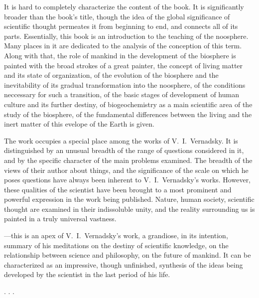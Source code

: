 It is hard to completely characterize the content of the book.  It is
significantly broader than the book's title, though the idea of the global
significance of scientific thought permeates it from beginning to end, and
connects all of its parts.  Essentially, this book is an introduction to the
teaching of the noosphere.  Many places in it are dedicated to the analysis of
the conception of this term.  Along with that, the role of mankind in the
development of the biosphere is painted with the broad strokes of a great
painter, the concept of living matter and its state of organization, of the
evolution of the biosphere and the inevitability of its gradual transformation
into the noosphere, of the conditions neccessary for such a transition, of the
basic stages of development of human culture and its further destiny, of
biogeochemistry as a main scientific area of the study of the biosphere, of the
fundamental differences between the living and the inert matter of this evelope
of the Earth is given.

The work  occupies a
special place among the works of V.~I.\ Vernadsky.  It is distinguished by an
unusual breadth of the range of questions considered in it, and by the specific
character of the main problems examined.  The breadth of the views of their
author about things, and the significance of the scale on which he poses
questions have always been inherent to V.~I.\ Vernadsky's works.  However,
these qualities of the scientist have been brought to a most prominent and
powerful expression in the work being published.  Nature, human society,
scientific thought are examined in their indissoluble unity, and the reality
surrounding us is painted in a truly universal vastness.

---this is an apex of
V.~I.\ Vernadsky's work, a grandiose, in its intention, summary of his
meditations on the destiny of scientific knowledge, on the relationship between
science and philosophy, on the future of mankind.  It can be characterized as
an impressive, though unfinished, synthesis of the ideas being developed by the
scientist in the last period of his life.

. . .
